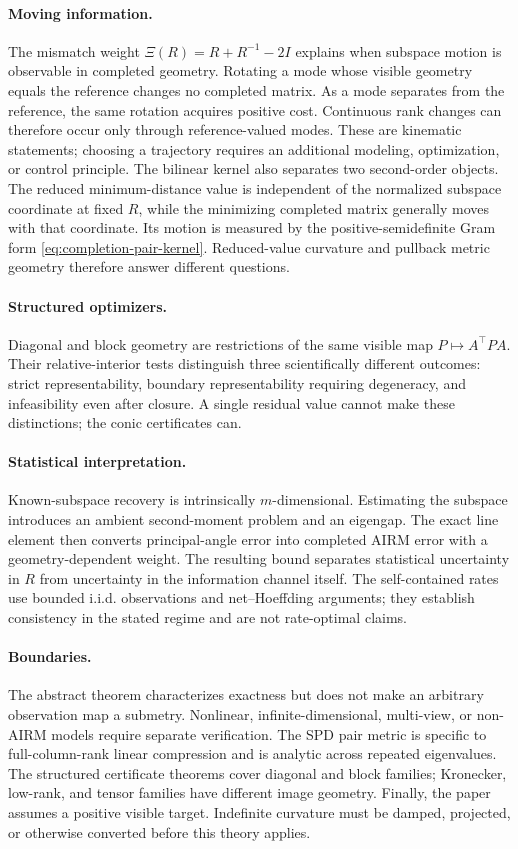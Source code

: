 \documentclass[10pt]{article}
\theoremstyle{plain}
\theoremstyle{definition}
\theoremstyle{remark}
\newcommand{\Xiop}{\Xi}
\begin{document}
\paragraph{Moving information.}
The mismatch weight \(\Xiop(R)=R+R^{-1}-2I\) explains when subspace motion is
observable in completed geometry.  Rotating a mode whose visible geometry
equals the reference changes no completed matrix.  As a mode separates from
the reference, the same rotation acquires positive cost.  Continuous rank
changes can therefore occur only through reference-valued modes.  These are
kinematic statements; choosing a trajectory requires an additional modeling,
optimization, or control principle.  The bilinear kernel also separates two
second-order objects.  The reduced minimum-distance value is independent of
the normalized subspace coordinate at fixed \(R\), while the minimizing
completed matrix generally moves with that coordinate.  Its motion is
measured by the positive-semidefinite Gram form
\eqref{eq:completion-pair-kernel}.  Reduced-value curvature and pullback
metric geometry therefore answer different questions.

\paragraph{Structured optimizers.}
Diagonal and block geometry are restrictions of the same visible map
\(P\mapsto A^\top PA\).  Their relative-interior tests distinguish three
scientifically different outcomes: strict representability, boundary
representability requiring degeneracy, and infeasibility even after closure.
A single residual value cannot make these distinctions; the conic certificates
can.

\paragraph{Statistical interpretation.}
Known-subspace recovery is intrinsically \(m\)-dimensional.  Estimating the
subspace introduces an ambient second-moment problem and an eigengap.  The exact
line element then converts principal-angle error into completed AIRM error
with a geometry-dependent weight.  The resulting bound separates statistical
uncertainty in \(R\) from uncertainty in the information channel itself.  The
self-contained rates use bounded i.i.d. observations and net--Hoeffding
arguments; they establish consistency in the stated regime and are not
rate-optimal claims.

\paragraph{Boundaries.}
The abstract theorem characterizes exactness but does not make an arbitrary
observation map a submetry.  Nonlinear, infinite-dimensional, multi-view, or
non-AIRM models require separate verification.  The SPD pair metric is
specific to full-column-rank linear compression and is analytic across
repeated eigenvalues.  The structured certificate
theorems cover diagonal and block families; Kronecker, low-rank, and tensor
families have different image geometry.  Finally, the paper assumes a
positive visible target.  Indefinite curvature must be damped, projected, or
otherwise converted before this theory applies.
\end{document}
